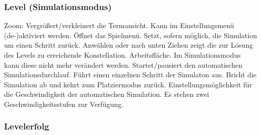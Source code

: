 \subsubsection{Level (Simulationsmodus)}

\begin{center}
\setlength\fboxsep{20pt}
\setlength\fboxrule{1pt}
\end{center}

\begin{requirements}
 Zoom: Vergrößert/verkleinert die Termansicht. Kann im Einstellungsmenü (de-)aktiviert werden.
 Öffnet das Spielmenü.
 Setzt, sofern möglich, die Simulation um einen Schritt zurück.
 Anwählen oder nach unten Ziehen zeigt die zur Lösung des Levels zu erreichende Konstellation.
 Arbeitsfläche. Im Simulationsmodus kann diese nicht mehr verändert werden.
 Startet/pausiert den automatischen Simulationsdurchlauf.
 Führt einen einzelnen Schritt der Simulaton aus.
 Bricht die Simulation ab und kehrt zum Platziermodus zurück.
 Einstellungsmöglichkeit für die Geschwindigkeit der automatischen Simulation. Es stehen zwei Geschwindigkeitsstufen zur Verfügung.
\end{requirements}

\subsubsection{Levelerfolg}

